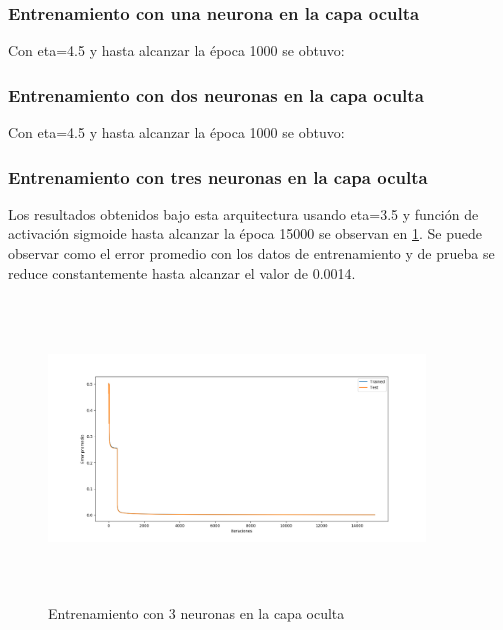 \documentclass[11pt]{article}
\begin{document}
\subsubsection{Entrenamiento con una neurona en la capa oculta}
Con eta=4.5 y hasta alcanzar la \'epoca 1000 se obtuvo:
\subsubsection{Entrenamiento con dos neuronas en la capa oculta}
Con eta=4.5 y hasta alcanzar la \'epoca 1000 se obtuvo:
\subsubsection{Entrenamiento con tres neuronas en la capa oculta}
Los resultados obtenidos bajo esta arquitectura usando eta=3.5 y funci\'on de activaci\'on sigmoide
hasta alcanzar la \'epoca 15000 se observan en \ref{result_3hn}. Se puede observar como el error promedio con los datos de entrenamiento y de prueba
se reduce constantemente hasta alcanzar el valor de 0.0014.
\begin{figure}[h]
    \includegraphics[width=10cm, height=8cm]{result_3hn}
    \centering
    \caption{Entrenamiento con 3 neuronas en la capa oculta}
    \label{result_3hn}
\end{figure}
\end{document}
